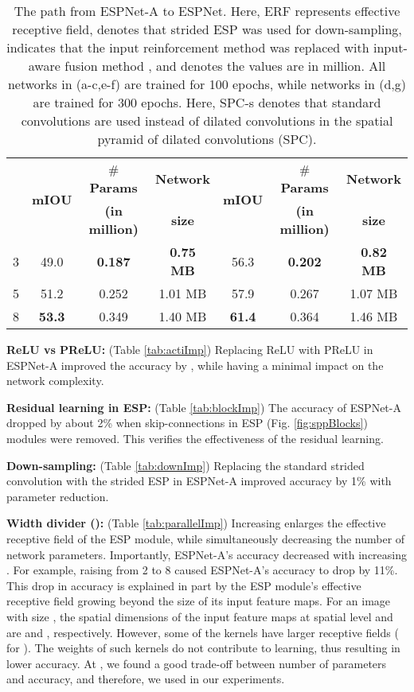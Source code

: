 \documentclass[runningheads]{llncs}
\def\Fig{Fig. }
\begin{document}
\begin{table}[t!]
\begin{subtable}[b]{0.4\columnwidth}
{\begin{tabular}{c|c|c|c||c|c|c}
				& \multirow{2}{*}{\textbf{mIOU}} & \# \textbf{Params} & \textbf{Network} & \multirow{2}{*}{\textbf{mIOU}} & \# \textbf{Params} & \textbf{Network}\\
				&  & \textbf{(in million)} & \textbf{size} &  & \textbf{(in million)} & \textbf{size}\\
				\midrule
				3 & 49.0 & \textbf{0.187} & \textbf{0.75 MB} & 56.3 & \textbf{0.202} & \textbf{0.82 MB} \\
				5 & 51.2 & 0.252 & 1.01 MB & 57.9  & 0.267 & 1.07 MB \\
				8 & \textbf{53.3} & 0.349 & 1.40 MB & \textbf{61.4} &  0.364 & 1.46 MB\\
				\bottomrule
			\end{tabular}
		}
		\caption{}
		\label{tab:espnetCompare}
	\end{subtable}
	\caption{The path from ESPNet-A to ESPNet. Here, ERF represents effective receptive field,  denotes that strided ESP was used for down-sampling,  indicates that the input reinforcement method was replaced with input-aware fusion method \cite{mehta2017learning}, 
		and  denotes the values are in million. All networks in (a-c,e-f) are trained for 100 epochs, while networks in (d,g) are trained for 300 epochs. Here, SPC-s denotes that  standard convolutions are used instead of dilated convolutions in the spatial pyramid of dilated convolutions (SPC).}
	\label{tab:ablationStudies}
\end{table}	

\noindent \textbf{ReLU vs PReLU:} (Table \ref{tab:actiImp}) Replacing ReLU \cite{nair2010rectified} with PReLU \cite{he2015delving} in ESPNet-A improved the accuracy by , while having a minimal impact on the network complexity.

\noindent \textbf{Residual learning in ESP:} (Table \ref{tab:blockImp}) The accuracy of ESPNet-A dropped by about 2\% when skip-connections in ESP (\Fig \ref{fig:sppBlocks}) modules were removed. This verifies the effectiveness of the residual learning.

\noindent \textbf{Down-sampling:} (Table \ref{tab:downImp}) Replacing the standard strided convolution with the strided ESP in ESPNet-A improved accuracy by 1\% with  parameter reduction.

\noindent \textbf{Width divider ():} (Table \ref{tab:parallelImp}) Increasing  enlarges the  effective receptive field of the ESP module, while simultaneously decreasing the number of network parameters. Importantly, ESPNet-A's accuracy decreased with increasing . For example, raising  from 2 to 8 caused  ESPNet-A's accuracy to drop by 11\%. This drop in accuracy is explained in part by the ESP module's effective receptive field growing beyond the size of its input feature maps. For an image with size , the spatial dimensions of the input feature maps at spatial level  and  are  and , respectively. However, some of the kernels have larger receptive fields ( for ). The weights of such kernels do not contribute to learning, thus resulting in lower accuracy. At , we found a good trade-off between number of parameters and accuracy, and therefore, we used  in our experiments.
\end{document}
